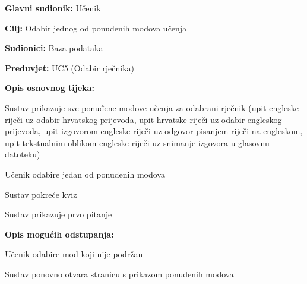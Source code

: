 					\noindent {}
					\begin{packed_item}
						
						\item \textbf{Glavni sudionik: }Učenik
						\item  \textbf{Cilj:} Odabir jednog od ponuđenih modova učenja 
						\item  \textbf{Sudionici:} Baza podataka
						\item  \textbf{Preduvjet:} UC5 (Odabir rječnika)
						\item  \textbf{Opis osnovnog tijeka:}
						
						\item[] \begin{packed_enum}
							
							\item Sustav prikazuje sve ponuđene modove učenja za odabrani rječnik (upit engleske riječi uz odabir hrvatskog prijevoda, upit hrvatske riječi uz odabir engleskog prijevoda, upit izgovorom engleske riječi uz odgovor pisanjem riječi na engleskom, upit tekstualnim oblikom engleske riječi uz snimanje izgovora u glasovnu datoteku)
							\item Učenik odabire jedan od ponuđenih modova
							\item Sustav pokreće kviz
							\item Sustav prikazuje prvo pitanje
							
						\end{packed_enum}
						
						\item  \textbf{Opis mogućih odstupanja:}
						
						\item[] \begin{packed_item}
							
							\item[2.a] Učenik odabire mod koji nije podržan 
							\item[] \begin{packed_enum}
								
								\item Sustav ponovno otvara stranicu s prikazom ponuđenih modova
								
							\end{packed_enum}
							
							
						\end{packed_item}
							
					\end{packed_item}
					
